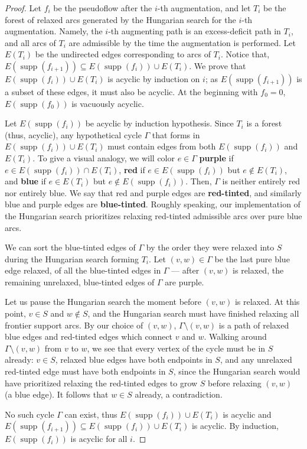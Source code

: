 \documentclass[11pt]{article}
\def\supp{\operatorname{supp}}
\theoremstyle{plain}
\numberwithin{figure}{section}
\def\EMPH#1{\textbf{\boldmath #1}}
\begin{document}
\begin{proof}
Let $f_i$ be the pseudoflow after the $i$-th augmentation, and let $T_i$ be the
forest of relaxed arcs generated by the Hungarian search for the $i$-th
augmentation.
Namely, the $i$-th augmenting path is an excess-deficit path in $T_i$, and all
arcs of $T_i$ are admissible by the time the augmentation is performed.
Let $E(T_i)$ be the undirected edges corresponding to arcs of $T_i$.
Notice that, $E(\supp(f_{i+1})) \subseteq E(\supp(f_i)) \cup E(T_i)$.
We prove that $E(\supp(f_i)) \cup E(T_i)$ is acyclic by induction on $i$;
as $E(\supp(f_{i+1}))$ is a subset of these edges, it must also be acyclic.
At the beginning with $f_0 = 0$, $E(\supp(f_0))$ is vacuously acyclic.

Let $E(\supp(f_i))$ be acyclic by induction hypothesis.
Since $T_i$ is a forest (thus, acyclic), any hypothetical cycle $\Gamma$ that
forms in $E(\supp(f_i)) \cup E(T_i)$ must contain edges from both
$E(\supp(f_i))$ and $E(T_i)$.
To give a visual analogy, we will color $e \in \Gamma$
\EMPH{purple} if $e \in E(\supp(f_i)) \cap E(T_i)$,
\EMPH{red} if $e \in E(\supp(f_i))$ but $e \not\in E(T_i)$,
and \EMPH{blue} if $e \in E(T_i)$ but $e \not\in E(\supp(f_i))$.
Then, $\Gamma$ is neither entirely red nor entirely blue.
We say that red and purple edges are \EMPH{red-tinted}, and similarly blue and
purple edges are \EMPH{blue-tinted}.
Roughly speaking, our implementation of the Hungarian search prioritizes
relaxing red-tinted admissible arcs over pure blue arcs. %

We can sort the blue-tinted edges of $\Gamma$ by the order they were relaxed
into $S$ during the Hungarian search forming $T_i$.
Let $(v, w) \in \Gamma$ be the last pure blue edge relaxed, of all the
blue-tinted edges in $\Gamma$ --- after $(v, w)$ is relaxed, the remaining
unrelaxed, blue-tinted edges of $\Gamma$ are purple.

Let us pause the Hungarian search the moment before $(v, w)$ is relaxed.
At this point, $v \in S$ and $w \not\in S$, and the Hungarian search must have
finished relaxing all frontier support arcs.
By our choice of $(v, w)$, $\Gamma \setminus (v, w)$ is a path of relaxed blue
edges and red-tinted edges which connect $v$ and $w$.
Walking around $\Gamma \setminus (v, w)$ from $v$ to $w$, we see that every
vertex of the cycle must be in $S$ already: $v \in S$, relaxed blue edges have
both endpoints in $S$, and any unrelaxed red-tinted edge must have both
endpoints in $S$, since the Hungarian search would have prioritized relaxing
the red-tinted edges to grow $S$ before relaxing $(v, w)$ (a blue edge).
It follows that $w \in S$ already, a contradiction.

No such cycle $\Gamma$ can exist, thus $E(\supp(f_i)) \cup E(T_i)$ is acyclic
and $E(\supp(f_{i+1})) \subseteq E(\supp(f_i)) \cup E(T_i)$ is acyclic.
By induction, $E(\supp(f_i))$ is acyclic for all $i$.
\end{proof}
\end{document}

